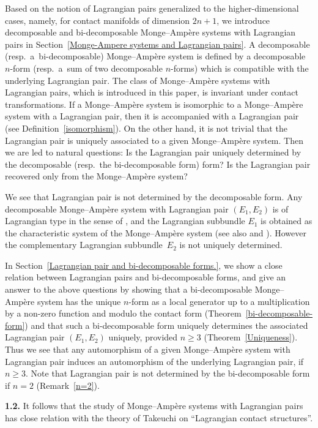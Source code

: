 \documentclass[pdftex]{sigma}
\begin{document}
Based on the notion of
Lagrangian pairs generalized to the higher-dimensional cases, namely, for
contact manifolds of dimension $2n+1$,
we introduce decomposable and bi-decomposable Monge--Amp{\`e}re systems with Lagrangian pairs
in Section~\ref{Monge-Ampere systems and Lagrangian pairs}.
A decomposable (resp.\ a~bi-decomposable) Monge--Amp{\`e}re system is def\/ined by
a decomposable $n$-form (resp.\ a~sum of two decomposable $n$-forms) which is compatible
with the underlying Lagrangian pair.
The class of Monge--Amp{\`e}re systems with Lagrangian pairs, which is introduced in this paper,
is invariant under contact transformations. If a Monge--Amp{\`e}re system is isomorphic to a Monge--Amp{\`e}re system
with a Lagrangian pair, then it is accompanied with a Lagrangian pair (see Def\/inition~\ref{isomorphism}).
On the other hand, it is not trivial that
the Lagrangian pair is uniquely asso\-cia\-ted to a given Monge--Amp{\`e}re
system. Then we are led to natural questions:
Is the Lagrangian pair uniquely determined
by the decomposable (resp.\ the bi-decomposable form) form?
Is the Lagrangian pair recovered
only from the Monge--Amp{\`e}re system?

We see that Lagrangian pair is not determined by the decomposable form.
Any decomposable Monge--Amp{\`e}re system with Lagrangian pair $(E_1, E_2)$
is of Lagrangian type in the sense of
\cite{M-M}, and the Lagrangian subbundle $E_1$ is obtained as the characteristic system of the Monge--Amp{\`e}re system (see also
\cite{Mo2} and \cite[Chapter~V]{B-C-3G}).
However the complementary Lagrangian subbundle~$E_2$ is not uniquely determined.

In Section~\ref{Lagrangian pair and bi-decomposable forms.},
we show a close relation between Lagrangian pairs
and bi-decomposable forms, and give an answer to the above
questions by showing that a bi-decomposable Monge--Amp{\`e}re system has the unique
$n$-form as a local generator
up to a multiplication by a non-zero function and modulo the contact form
(Theorem~\ref{bi-decomposable-form}) and that
such a bi-decomposable form uniquely determines the associated Lagrangian pair $(E_1, E_2)$ uniquely,
provided $n\geq 3$ (Theorem~\ref{Uniqueness}).
Thus we see that any automorphism of a given Monge--Amp{\`e}re system
with Lagrangian pair induces an automorphism of the underlying Lagrangian pair, if $n \geq 3$.
Note that Lagrangian pair is not determined by the bi-decomposable form
if $n = 2$ (Remark~\ref{n=2}).


{\bf 1.2.}
It follows that
the study of Monge--Amp{\`e}re systems with Lagrangian pairs has close relation with
the theory of Takeuchi \cite{Tak} on ``Lagrangian contact structures''.
\end{document}

